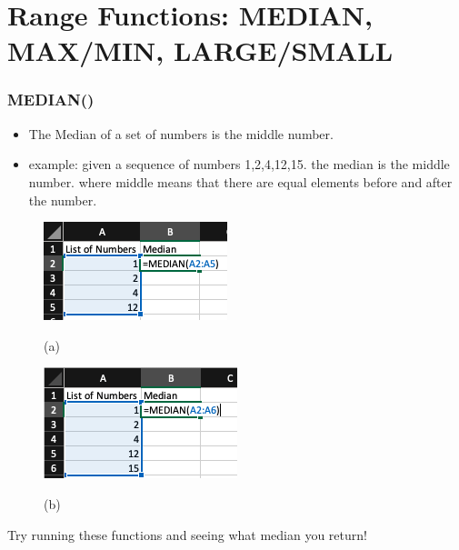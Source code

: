 \documentclass[12pt]{beamer}
\begin{document}
\section{Range Functions: MEDIAN, MAX/MIN, LARGE/SMALL}
	\begin{frame}
		\frametitle{MEDIAN()}
		\begin{itemize}
			\item The Median of a set of numbers is the middle number. 
			\item	example: given a sequence of numbers 1,2,4,12,15. the median is the middle number. where middle means that there are equal elements before and after the number. 
		\end{itemize}
		\begin{figure}[htb]
	\begin{minipage}[t]{0.5\linewidth}\centering
		\includegraphics[width=0.9\linewidth]{MEDIAN_even.png}
		\medskip
		\centerline{(a)}
	\end{minipage}\hfill
	\begin{minipage}[t]{0.5\linewidth}\centering
		\includegraphics[width=0.9\linewidth]{MEDIAN_odd.png}
		\medskip
		\centerline{(b)}
	\end{minipage}
\end{figure}
Try running these functions and seeing what median you return!
	\end{frame}
\end{document}
